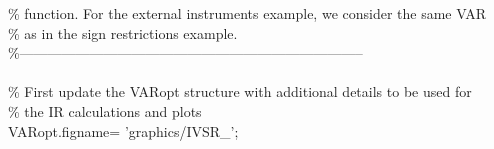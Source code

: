 \hspace{1mm}\hspace{5mm} \hspace{5mm} \hspace{5mm} \hspace{5mm} \textcolor{matlabgreen}{\% function. For the external instruments example, we consider the same VAR  }\\ 
\hspace{1mm}\hspace{5mm} \hspace{5mm} \hspace{5mm} \hspace{5mm} \textcolor{matlabgreen}{\% as in the sign restrictions example.  }\\ 
\hspace{1mm}\hspace{5mm} \hspace{5mm} \hspace{5mm} \hspace{5mm} \textcolor{matlabgreen}{\%--------------------------------------------------------------------------  }\\ 
\hspace{1mm}\hspace{5mm} \hspace{5mm} \hspace{5mm} \hspace{5mm}  \\ 
\hspace{1mm}\hspace{5mm} \hspace{5mm} \hspace{5mm} \hspace{5mm} \textcolor{matlabgreen}{\% First update the VARopt structure with additional details to be used \textcolor{matlabblue}{for} }\\ 
\hspace{1mm}\hspace{5mm} \hspace{5mm} \hspace{5mm} \hspace{5mm} \hspace{5mm} \textcolor{matlabgreen}{\% the IR calculations and plots }\\ 
\hspace{1mm}\hspace{5mm} \hspace{5mm} \hspace{5mm} \hspace{5mm} \hspace{5mm} VARopt.figname= \textcolor{matlabpurple}{'graphics/IVSR\_'}; \\ 
